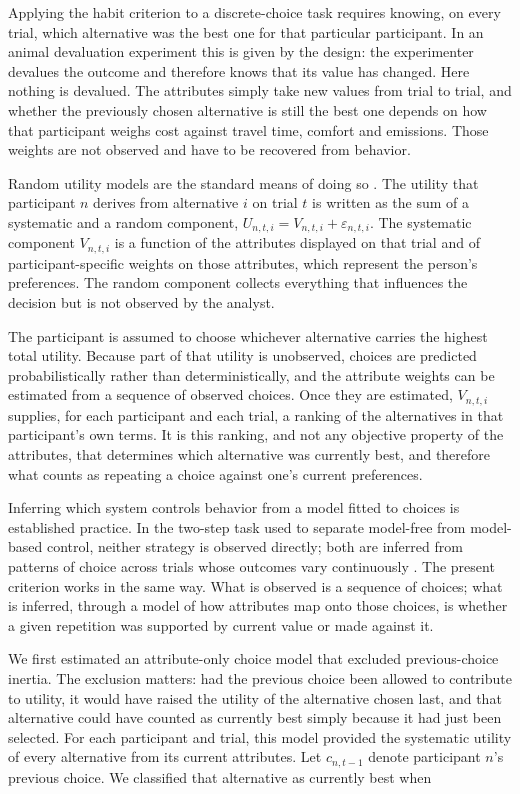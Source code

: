 \documentclass[man,natbib,floatsintext]{apa7}
\begin{document}
Applying the habit criterion to a discrete-choice task requires knowing, on every trial, which alternative was the best one for that particular participant. In an animal devaluation experiment this is given by the design: the experimenter devalues the outcome and therefore knows that its value has changed. Here nothing is devalued. The attributes simply take new values from trial to trial, and whether the previously chosen alternative is still the best one depends on how that participant weighs cost against travel time, comfort and emissions. Those weights are not observed and have to be recovered from behavior. 

Random utility models are the standard means of doing so \citep{mcfadden1974,train2009}. The utility that participant $n$ derives from alternative $i$ on trial $t$ is written as the sum of a systematic and a random component, $U_{n,t,i}=V_{n,t,i}+\varepsilon_{n,t,i}$. The systematic component $V_{n,t,i}$ is a function of the attributes displayed on that trial and of participant-specific weights on those attributes, which represent the person's preferences. The random component collects everything that influences the decision but is not observed by the analyst.

The participant is assumed to choose whichever alternative carries the highest total utility. Because part of that utility is unobserved, choices are predicted probabilistically rather than deterministically, and the attribute weights can be estimated from a sequence of observed choices. Once they are estimated, $V_{n,t,i}$ supplies, for each participant and each trial, a ranking of the alternatives in that participant's own terms. It is this ranking, and not any objective property of the attributes, that determines which alternative was currently best, and therefore what counts as repeating a choice against one's current preferences.

Inferring which system controls behavior from a model fitted to choices is established practice. In the two-step task used to separate model-free from model-based control, neither strategy is observed directly; both are inferred from patterns of choice across trials whose outcomes vary continuously \citep{daw2011}. The present criterion works in the same way. What is observed is a sequence of choices; what is inferred, through a model of how attributes map onto those choices, is whether a given repetition was supported by current value or made against it.

We first estimated an attribute-only choice model that excluded previous-choice inertia. The exclusion matters: had the previous choice been allowed to contribute to utility, it would have raised the utility of the alternative chosen last, and that alternative could have counted as currently best simply because it had just been selected. For each participant and trial, this model provided the systematic utility of every alternative from its current attributes. Let $c_{n,t-1}$ denote participant $n$'s previous choice. We classified that alternative as currently best when
\end{document}
